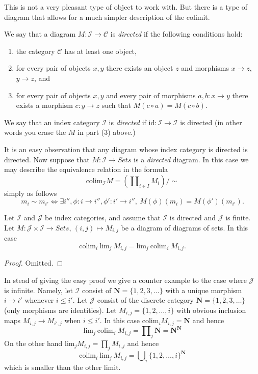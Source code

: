 \medskip\noindent
This is not a very pleasant type of object to work with.
But there is a type of diagram that allows for a much simpler
description of the colimit.

\begin{definition}
\label{definition-directed}
We say that a diagram $M : \mathcal{I} \to \mathcal{C}$ is {\it directed}
if the following conditions hold:
\begin{enumerate}
\item the category $\mathcal{C}$ has at least one object,
\item for every pair of objects $x, y$ 
there exists an object $z$ and morphisms $x \to z$,
$y \to z$, and
\item for every pair of objects $x, y$ and every pair of
morphisms $a, b : x \to y$ there exists a morphism
$c : y \to z$ such that $M(c \circ a) = M(c \circ b)$.
\end{enumerate}
We say that an index category $\mathcal{I}$ is {\it directed} if
$\text{id} : \mathcal{I} \to \mathcal{I}$ is directed (in other words
you erase the $M$ in part (3) above.)
\end{definition}

\noindent
It is an easy observation that any diagram whose index category is
directed is directed. Now suppose that $M : \mathcal{I} \to
\textit{Sets}$ is a {\it directed} diagram. In this case we may
describe the equivalence relation in the formula
$$
\text{colim}_{\mathcal{I}} M
=
(\coprod\nolimits_{i\in I} M_i)/\sim
$$
simply as follows
$$
m_i \sim m_{i'} 
\Leftrightarrow
\exists i'', \phi : i \to i'', \phi': i' \to i'',\ 
M(\phi)(m_i) = M(\phi')(m_{i'}).
$$

\begin{lemma}
\label{lemma-directed-commutes}
Let $\mathcal{I}$ and $\mathcal{J}$ be index categories,
and assume that $\mathcal{I}$ is directed and $\mathcal{J}$
is finite. Let
$M : \mathcal{J} \times \mathcal{I} \to \textit{Sets}$,
$(i,j) \mapsto M_{i,j}$ be a diagram of diagrams of sets.
In this case
$$
\text{colim}_i\ \text{lim}_j\ M_{i,j} 
=
\text{lim}_j\ \text{colim}_i\ M_{i,j}. 
$$
\end{lemma}

\begin{proof}
Omitted.
\end{proof}

\noindent
In stead of giving the easy proof we give a counter example to
the case where $\mathcal{J}$ is infinite. Namely, let
$\mathcal{I}$ consist of $\mathbf{N} = \{1,2,3,\ldots\}$
with a unique morphism $i \to i'$ whenever $i \leq i'$.
Let $\mathcal{J}$ consist of the discrete category
$\mathbf{N} = \{1,2,3,\ldots\}$ (only morphisms are identities).
Let $M_{i,j} = \{1,2,\ldots,i\}$ with obvious inclusion maps
$M_{i,j} \to M_{i',j}$ when $i \leq i'$. In this case
$\text{colim}_i M_{i,j} = \mathbf{N}$ and hence
$$
\text{lim}_j\ \text{colim}_i\ M_{i,j}
=
\prod\nolimits_j \mathbf{N}
=
\mathbf{N}^\mathbf{N}
$$
On the other hand $\text{lim}_j M_{i,j} = \prod\nolimits_j M_{i,j}$ and
hence
$$
\text{colim}_i\ \text{lim}_j\ M_{i,j}
=
\bigcup\nolimits_i \{1,2, \ldots, i\}^{\mathbf{N}}
$$
which is smaller than the other limit.

